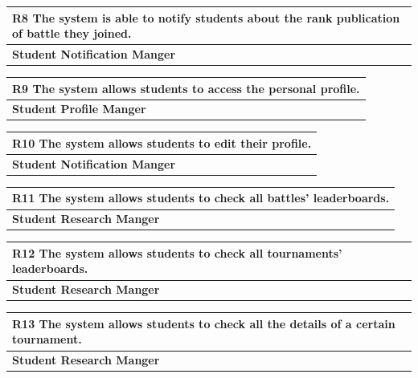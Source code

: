 \documentclass[12pt, a4paper]{report}
\begin{document}
\begin{table}[H]
    \begin{tabularx}{\textwidth}{X}
    \textbf{R8} The system is able to notify students about the rank publication of
    battle they joined.\\
    \hline 
    \textbf{Student Notification Manger}
    \end{tabularx}
\end{table}

\begin{table}[H]
    \begin{tabularx}{\textwidth}{X}
    \textbf{R9} The system allows students to access the personal profile.\\
    \hline 
    \textbf{Student Profile Manger}
\end{tabularx}
\end{table}

\begin{table}[H]
    \begin{tabularx}{\textwidth}{X}
    \textbf{R10} The system allows students to edit their profile.\\
    \hline 
    \textbf{Student Notification Manger}
\end{tabularx}
\end{table}

\begin{table}[H]
    \begin{tabularx}{\textwidth}{X}
    \textbf{R11} The system allows students to check all battles' leaderboards.\\
    \hline 
    \textbf{Student Research Manger}
\end{tabularx}
\end{table}

\begin{table}[H]
    \begin{tabularx}{\textwidth}{X}
    \textbf{R12} The system allows students to check all tournaments' leaderboards.\\
    \hline 
    \textbf{Student Research Manger}
\end{tabularx}
\end{table}

\begin{table}[H]
    \begin{tabularx}{\textwidth}{X}
    \textbf{R13} The system allows students to check all the details of a certain tournament.\\
    \hline 
    \textbf{Student Research Manger}
\end{tabularx}
\end{table}
\end{document}
